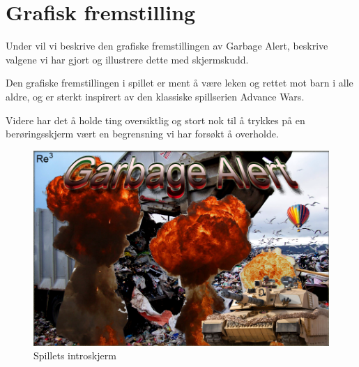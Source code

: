 \section{Grafisk fremstilling}
Under vil vi beskrive den grafiske fremstillingen av Garbage Alert, beskrive valgene vi har gjort og illustrere dette med skjermskudd.

Den grafiske fremstillingen i spillet er ment å være leken og rettet mot barn i alle aldre, og er sterkt inspirert av den klassiske spillserien Advance Wars\cite{advancewars}.

Videre har det å holde ting oversiktlig og stort nok til å trykkes på en berøringsskjerm vært en begrensning vi har forsøkt å overholde.


\begin{center}
	\begin{figure}
		\includegraphics[width=\textwidth]{images/splashscreen.png}
		\caption{Spillets introskjerm}
		\label{fig:splashscreen}
	\end{figure}
\end{center}

